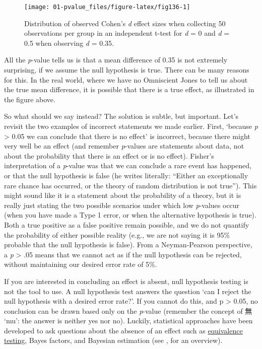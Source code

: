 \documentclass[
  oneside]{krantz}
\begin{document}
\begin{figure}

{\centering \texttt{[image: 01-pvalue\_files/figure-latex/fig136-1]} 

}

\caption{Distribution of observed Cohen's \emph{d} effect sizes when collecting 50 observations per group in an independent t-test for \emph{d} = 0 and \emph{d} = 0.5 when observing \emph{d} = 0.35.}\label{fig:fig136}
\end{figure}

All the \emph{p}-value tells us is that a mean difference of 0.35 is not extremely surprising, if we assume the null hypothesis is true. There can be many reasons for this. In the real world, where we have no Omniscient Jones to tell us about the true mean difference, it is possible that there is a true effect, as illustrated in the figure above.

So what should we say instead? The solution is subtle, but important. Let's revisit the two examples of incorrect statements we made earlier. First, `because \emph{p} \textgreater{} 0.05 we can conclude that there is no effect' is incorrect, because there might very well be an effect (and remember \emph{p}-values are statements about data, not about the probability that there is an effect or is no effect). Fisher's interpretation of a \emph{p}-value was that we can conclude a rare event has happened, or that the null hypothesis is false (he writes literally: ``Either an exceptionally rare chance has occurred, or the theory of random distribution is not true''). This might sound like it is a statement about the probability of a theory, but it is really just stating the two possible scenarios under which low \emph{p}-values occur (when you have made a Type 1 error, or when the alternative hypothesis is true). Both a true positive as a false positive remain possible, and we do not quantify the probability of either possible reality (e.g., we are not saying it is 95\% probable that the null hypothesis is false). From a Neyman-Pearson perspective, a \emph{p} \textgreater{} .05 means that we cannot act as if the null hypothesis can be rejected, without maintaining our desired error rate of 5\%.

If you are interested in concluding an effect is absent, null hypothesis testing is not the tool to use. A null hypothesis test answers the question `can I reject the null hypothesis with a desired error rate?'. If you cannot do this, and p \textgreater{} 0.05, no conclusion can be drawn based only on the \emph{p}-value (remember the concept of 無 `mu': the answer is neither yes nor no). Luckily, statistical approaches have been developed to ask questions about the absence of an effect such as \protect\hyperlink{equivalencetest}{equivalence testing}, Bayes factors, and Bayesian estimation (see \citet{harms_making_2018}, for an overview).
\end{document}
